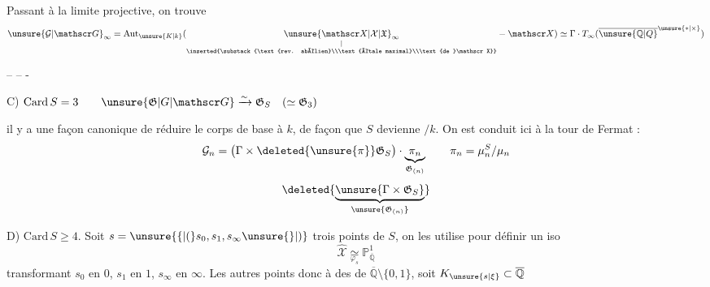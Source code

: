 Passant à la limite projective, on trouve
\[
\unsure{\mathcal G|\mathscr G}_\infty=\mathrm{Aut}_{\unsure{K|k}}(\underset{\substack{\vert\\\inserted{\substack{\text{rev. abélien}\\\text{étale maximal}\\\text{de }\mathscr X}}}}{\unsure{\mathscr X|\mathcal X|\mathfrak X}_\infty}\mathbin{-}\mathscr X)\simeq\Gamma\mathbin{\cdot}T_\infty(\overline{\unsure{\mathbb Q|Q}}^{\unsure{*|\times}})
\]

-- -- -

C) $\mathrm{Card}\,S=3\qquad\unsure{\mathfrak G|G|\mathscr G}\xrightarrow{\sim}\mathfrak G_S\quad(\simeq\mathfrak G_3)$

il y a une façon canonique de réduire le corps de base à $k$, de façon que $S$ devienne  $/k$. On est conduit ici à la tour de Fermat :
\[
\mathcal G_n=\bigl(\Gamma\times\deleted{\unsure{\pi}}\mathfrak G_S\bigr)\mathbin{\cdot}\underbrace{\pi_n}_{\mathfrak G_{(n)}}\qquad \pi_n=\mu_n^{S}/\mu_n
\]
\[
\deleted{\underbrace{\unsure{\Gamma\times\mathfrak G_S}}_{\unsure{\mathfrak G_{(n)}}}}
\]

D) $\mathrm{Card}\,S\geq4$. Soit  $s=\unsure{\{|(}s_0,s_1,s_\infty\unsure{\}|)}$  trois points  de $S$, on les utilise pour définir un iso
\[
\widehat{\mathscr X}\underset{\varphi_s}{\simeq}\mathbb P^1_{\overline{\mathbb Q}}
\]
transformant $s_0$ en $0$, $s_1$ en $1$, $s_\infty$ en $\infty$. Les autres points   donc à des  de $\overline{\mathbb Q}\setminus\{0,1\}$, soit $K_{\unsure{s|\xi}}\subset\overline{\mathbb Q}$

